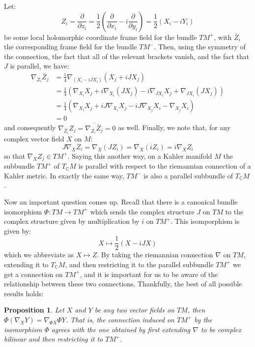 \documentclass[11pt]{amsart}
\newtheorem{prop}[subsection]{Proposition}
\theoremstyle{definition}
\def \C{ \mathbb{C} }
\def \del{ \partial }
\begin{document}
Let:
%
$$ Z_i = \frac{ \del }{ \del z_i } = \frac{1}{2} \left( \frac{ \del }{ \del x_i } - i \frac{ \del }{ \del y_i } \right) = \frac{1}{2}\left( X_i - i Y_i \right) $$
%
be some local holomorphic coordinate frame field for the bundle $TM^{+}$, with $\bar{Z}_i$ the corresponding frame field for the bundle $TM^{-}$.
Then, using the symmetry of the connection, the fact that all of the relevant brackets vanish, and the fact that $J$ is parallel, we have:
%
\begin{align*}
\nabla_{Z_i} \bar{Z}_j &= \frac{1}{4} \nabla_{(X_i - i J X_i)} (X_j + i J X_j ) \\
&= \frac{1}{4} ( \nabla_{X_i} X_j + i \nabla_{X_i} (J X_j) - i \nabla_{J X_i} X_j + \nabla_{J X_i} ( J X_j ) )\\
&= \frac{1}{4} ( \nabla_{X_i} X_j + i J \nabla_{X_i} X_j - i J \nabla_{X_j} X_i - \nabla_{X_j} X_i ) \\
&= 0
\end{align*}
%
and consequently $\nabla_{\bar{Z}_i} Z_j = \overline{ \nabla_{Z_i} \bar{Z}_j } = 0$ as well.  Finally, we note that, for any complex vector field $X$ on $M$:
%
$$ J \nabla_{X} Z_i = \nabla_{X}(J Z_i) = \nabla_{X}( iZ_i ) = i \nabla_{X} Z_i $$
%
so that $\nabla_{X} Z_j \in TM^{+}$.  Saying this another way, on a Kahler manifold $M$ the subbundle $TM^{+}$ of $T_{\C} M$ is parallel with respect to the riemannian connection of a Kahler metric.  In exactly the same way, $TM^{-}$ is also a parallel subbundle of $T_{\C}M$ .

Now an important question comes up.  Recall that there is a canonical bundle isomorphism $\Phi: TM \rightarrow TM^{+}$ which sends the complex structure $J$ on $TM$ to the complex structure given by multiplication by $i$ on $TM^{+}$.  This isomporphism is given by:
%
$$ X \mapsto \frac{1}{2}( X - i JX )$$
%
which we abbreviate as $X \mapsto Z$.  By taking the riemannian connection $\nabla$ on $TM$, extending it to $T_{\C}M$, and then restricting it to the parallel subbundle $TM^{+}$ we get a connection on $TM^{+}$, and it is important for us to be aware of the relationship between these two connections.  Thankfully, the best of all possible results holds:

\begin{prop} Let $X$ and $Y$ be any two vector fields on $TM$, then $\Phi( \nabla_X Y ) = \nabla_{ \Phi X } \Phi Y$.  That is, the connection induced on $TM^{+}$ by the isomorphism $\Phi$ agrees with the one obtained by first extending $\nabla$ to be complex bilinear and then restricting it to $TM^{+}$.
\end{prop}
\end{document}
